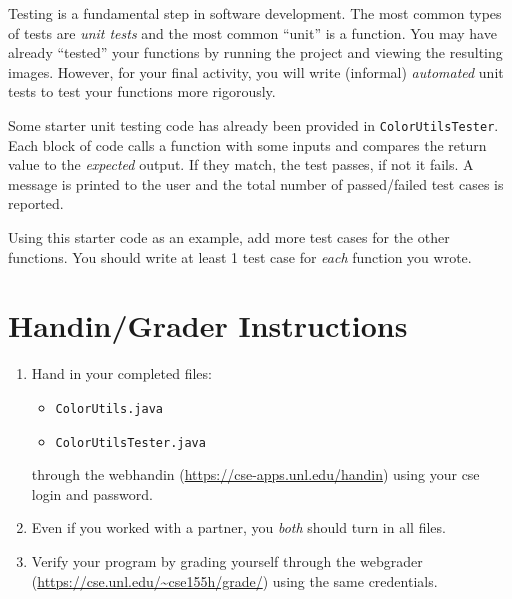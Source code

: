 \documentclass[12pt]{scrartcl}
\begin{document}
Testing is a fundamental step in software development.  The most common types
of tests are \emph{unit tests} and the most common ``unit'' is a function.
You may have already ``tested'' your functions by running the project and 
viewing the resulting images.  However, for your final activity, you will
write (informal) \emph{automated} unit tests to test your functions more 
rigorously.  

Some starter unit testing code has already been provided in 
\texttt{ColorUtilsTester}.  Each block of code calls a function
with some inputs and compares the return value to the \emph{expected}
output.  If they match, the test passes, if not it fails.  A message is
printed to the user and the total number of passed/failed test cases is
reported.  

Using this starter code as an example, add more test cases for the 
other functions.  You should write at least 1 test case for 
\emph{each} function you wrote.  

\section{Handin/Grader Instructions}

\begin{enumerate}
  \item Hand in your completed files:
  \begin{itemize}
    \item \texttt{ColorUtils.java}
    \item \texttt{ColorUtilsTester.java}
  \end{itemize}
  through the webhandin (\url{https://cse-apps.unl.edu/handin}) 
  using your cse login and password.  
  \item Even if you worked with a partner, you \emph{both} should
  turn in all files.
  \item Verify your program by grading yourself through the
  webgrader (\url{https://cse.unl.edu/~cse155h/grade/}) using the
  same credentials.
\end{enumerate}
\end{document}
